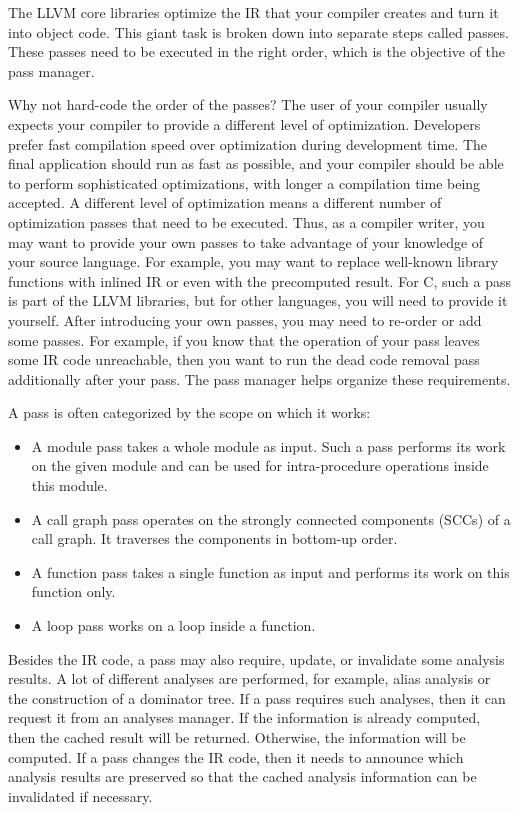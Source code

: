 The LLVM core libraries optimize the IR that your compiler creates and turn it into object code. This giant task is broken down into separate steps called passes. These passes need to be executed in the right order, which is the objective of the pass manager.

Why not hard-code the order of the passes? The user of your compiler usually expects your compiler to provide a different level of optimization. Developers prefer fast compilation speed over optimization during development time. The final application should run as fast as possible, and your compiler should be able to perform sophisticated optimizations, with longer a compilation time being accepted. A different level of optimization means a different number of optimization passes that need to be executed. Thus, as a compiler writer, you may want to provide your own passes to take advantage of your knowledge of your source language. For example, you may want to replace well-known library functions with inlined IR or even with the precomputed result. For C, such a pass is part of the LLVM libraries, but for other languages, you will need to provide it yourself. After introducing your own passes, you may need to re-order or add some passes. For example, if you know that the operation of your pass leaves some IR code unreachable, then you want to run the dead code removal pass additionally after your pass. The pass manager helps organize these requirements.

A pass is often categorized by the scope on which it works:

\begin{itemize}
\item
A module pass takes a whole module as input. Such a pass performs its work on the given module and can be used for intra-procedure operations inside this module.

\item
A call graph pass operates on the strongly connected components (SCCs) of a call graph. It traverses the components in bottom-up order.

\item
A function pass takes a single function as input and performs its work on this function only.

\item
A loop pass works on a loop inside a function.
\end{itemize}

Besides the IR code, a pass may also require, update, or invalidate some analysis results. A lot of different analyses are performed, for example, alias analysis or the construction of a dominator tree. If a pass requires such analyses, then it can request it from an analyses manager. If the information is already computed, then the cached result will be returned. Otherwise, the information will be computed. If a pass changes the IR code, then it needs to announce which analysis results are preserved so that the cached analysis information can be invalidated if necessary.

